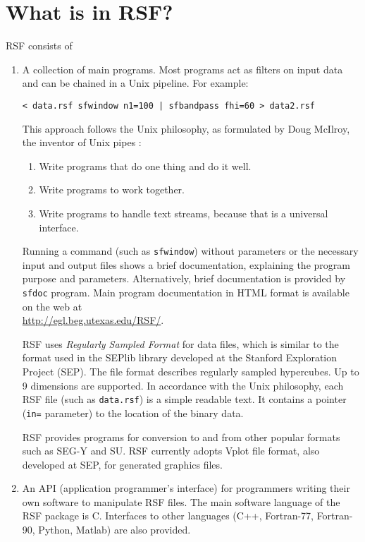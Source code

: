 \section{What is in RSF?}

RSF consists of
\begin{enumerate}
\item A collection of main programs. Most programs act as filters on input
  data and can be chained in a Unix pipeline. For example:
\begin{verbatim}
< data.rsf sfwindow n1=100 | sfbandpass fhi=60 > data2.rsf
\end{verbatim}
This approach follows the Unix philosophy, as formulated by Doug McIlroy,
the inventor of Unix pipes \cite[]{salus}:
\begin{enumerate}
\item Write programs that do one thing and do it well. 
\item Write programs to work together. 
\item Write programs to handle text streams, because that is a universal
  interface.
\end{enumerate}

Running a command (such as \texttt{sfwindow}) without parameters or the
necessary input and output files shows a brief documentation, explaining the
program purpose and parameters.  Alternatively, brief documentation is
provided by \texttt{sfdoc} program. Main program documentation in HTML format
is available on the web at \\ \url{http://egl.beg.utexas.edu/RSF/}.

RSF uses \emph{Regularly Sampled Format} for data files, which is similar
to the format used in the SEPlib library developed at the Stanford Exploration
Project (SEP). The file format describes regularly sampled hypercubes. Up to 9
dimensions are supported. In accordance with the Unix philosophy, each RSF
file (such as \texttt{data.rsf}) is a simple readable text. It contains a
pointer (\texttt{in=} parameter) to the location of the binary data. 

RSF provides programs for conversion to and from other popular formats such as
SEG-Y and SU. RSF currently adopts Vplot file format, also developed at SEP,
for generated graphics files.

\item An API (application programmer's interface) for programmers writing
  their own software to manipulate RSF files. The main software language of
  the RSF package is C. Interfaces to other languages (C++, Fortran-77,
  Fortran-90, Python, Matlab) are also provided.
  

\end{enumerate}
